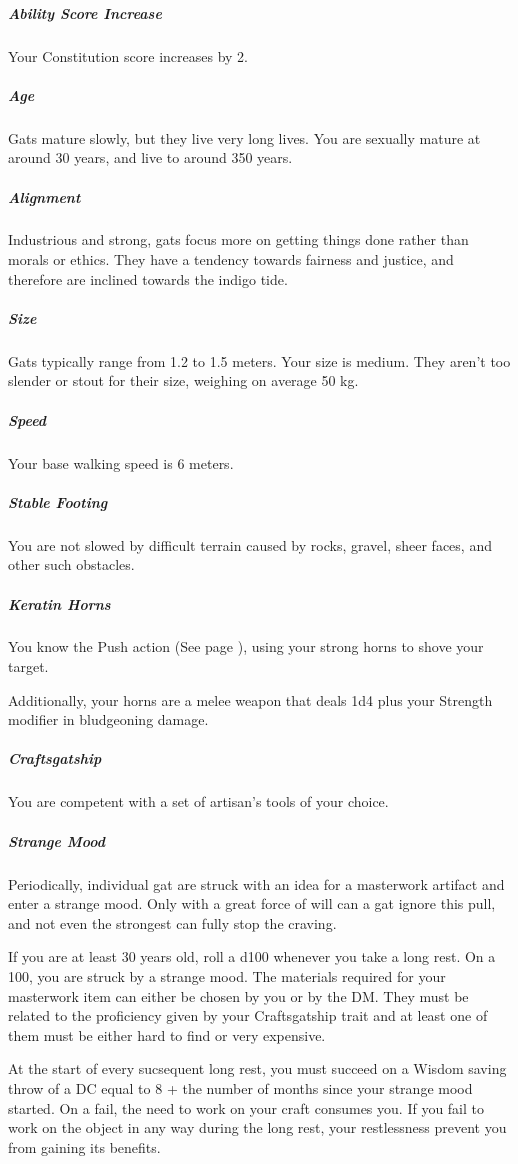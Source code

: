     \subparagraph{Ability Score Increase} Your Constitution score increases by 2.

    \subparagraph{Age} Gats mature slowly, but they live very long lives.
    You are sexually mature at around 30 years, and live to around 350 years.

    \subparagraph{Alignment} Industrious and strong, gats focus more on getting things done rather than morals or ethics.
    They have a tendency towards fairness and justice, and therefore are inclined towards the indigo tide.

    \subparagraph{Size} Gats typically range from 1.2 to 1.5 meters.
    Your size is medium.
    They aren't too slender or stout for their size, weighing on average 50 kg.

    \subparagraph{Speed} Your base walking speed is 6 meters.

    \subparagraph{Stable Footing} You are not slowed by difficult terrain caused by rocks, gravel, sheer faces, and other such obstacles.

    \subparagraph{Keratin Horns} You know the Push action (See page \pageref{act::push}), using your strong horns to shove your target.

    Additionally, your horns are a melee weapon that deals 1d4 plus your Strength modifier in bludgeoning damage.

    \subparagraph{Craftsgatship} You are competent with a set of artisan's tools of your choice.

    \subparagraph{Strange Mood} Periodically, individual gat are struck with an idea for a masterwork artifact and enter a strange mood.
    Only with a great force of will can a gat ignore this pull, and not even the strongest can fully stop the craving.

    If you are at least 30 years old, roll a d100 whenever you take a long rest.
    On a 100, you are struck by a strange mood.
    The materials required for your masterwork item can either be chosen by you or by the DM.
    They must be related to the proficiency given by your Craftsgatship trait and at least one of them must be either hard to find or very expensive.

    At the start of every sucsequent long rest, you must succeed on a Wisdom saving throw of a DC equal to 8 + the number of months since your strange mood started.
    On a fail, the need to work on your craft consumes you.
    If you fail to work on the object in any way during the long rest, your restlessness prevent you from gaining its benefits.

